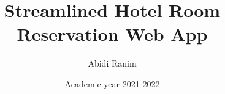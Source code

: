 \documentclass[a4paper,12pt]{report}
\numberwithin{equation}{section}
\begin{document}
\title{Streamlined Hotel Room Reservation Web App }
\author{Abidi Ranim}
\date{Academic year 2021-2022}

\newcommand{\HRule}{\rule{\linewidth}{0.6mm}}




               
\tableofcontents
\listoffigures


\newcommand{\RNum}[1]{\uppercase\expandafter{\romannumeral #1\relax}}






\renewcommand{\arraystretch}{1.5}













\nocite{*}



\end{document}
